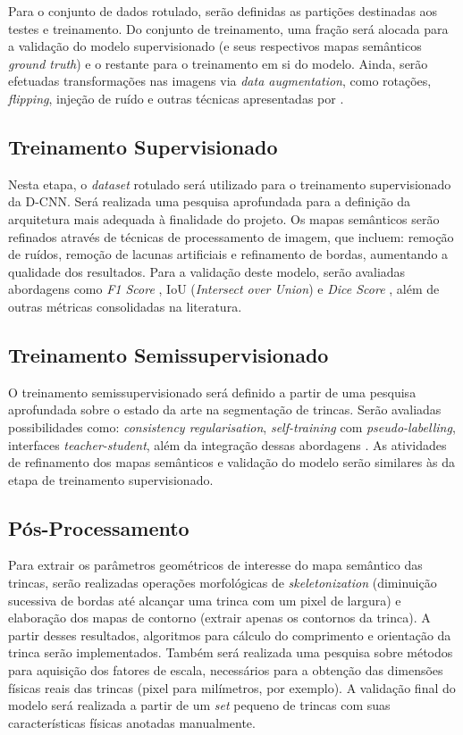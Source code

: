 \documentclass[12pt]{article}
\begin{document}
Para o conjunto de dados rotulado, serão definidas as partições destinadas aos testes e treinamento. %
Do conjunto de treinamento, uma fração será alocada para a validação do modelo supervisionado (e seus respectivos mapas semânticos \textit{ground truth}) e o restante para o treinamento em si do modelo. Ainda, serão efetuadas transformações nas imagens via \textit{data augmentation}, como rotações, \textit{flipping}, injeção de ruído e outras técnicas apresentadas por \textcite{6shorten2019survey}.

\subsection{Treinamento Supervisionado}

Nesta etapa, o \textit{dataset} rotulado será utilizado para o treinamento supervisionado da D-CNN. Será realizada uma pesquisa aprofundada para a definição da arquitetura mais adequada à finalidade do projeto. Os mapas semânticos serão refinados através de técnicas de processamento de imagem, que incluem: remoção de ruídos, remoção de lacunas artificiais e refinamento de bordas, aumentando a qualidade dos resultados. Para a validação deste modelo, serão avaliadas abordagens como \textit{F1 Score} \cite{15wang2021semi}, IoU (\textit{Intersect over Union}) e \textit{Dice Score} \cite{18shamsabadi2024efficient}, além de outras métricas consolidadas na literatura.

\subsection{Treinamento Semissupervisionado}

O treinamento semissupervisionado será definido a partir de uma pesquisa aprofundada sobre o estado da arte na segmentação de trincas. Serão avaliadas possibilidades como: \textit{consistency regularisation}, \textit{self-training} com \textit{pseudo-labelling}, interfaces \textit{teacher-student}, além da integração dessas abordagens \cite{18shamsabadi2024efficient}. As atividades de refinamento dos mapas semânticos e validação do modelo serão similares às da etapa de treinamento supervisionado.

\subsection{Pós-Processamento}

Para extrair os parâmetros geométricos de interesse do mapa semântico das trincas, serão realizadas operações morfológicas de \textit{skeletonization} (diminuição sucessiva de bordas até alcançar uma trinca com um pixel de largura) \cite{13bhowmick2020vision} e elaboração dos mapas de contorno (extrair apenas os contornos da trinca). A partir desses resultados, algoritmos para cálculo do comprimento e orientação da trinca serão implementados. Também será realizada uma pesquisa sobre métodos para aquisição dos fatores de escala, necessários para a obtenção das dimensões físicas reais das trincas (pixel para milímetros, por exemplo). A validação final do modelo será realizada a partir de um \textit{set} pequeno de trincas com suas características físicas anotadas manualmente.
\end{document}
